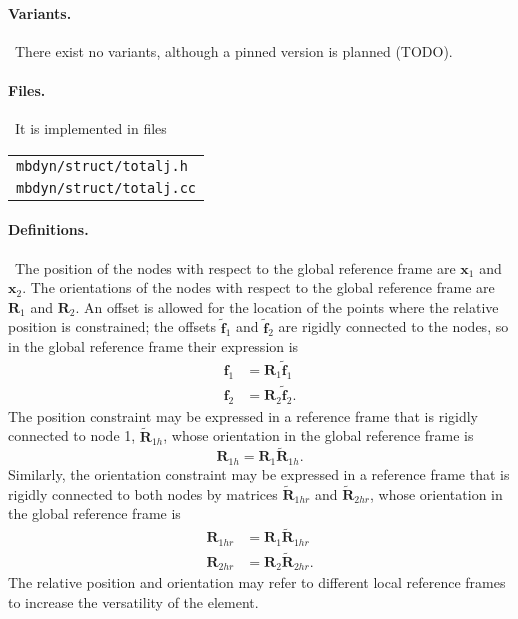 \documentclass[10pt,dvips,fleqn]{report}
\newcommand{\T}[1]{\boldsymbol{#1}}
\begin{document}
\paragraph{Variants.} \
There exist no variants, although a pinned version is planned (TODO).

\paragraph{Files.} \
It is implemented in files\\
\begin{tabular}{l}
\texttt{mbdyn/struct/totalj.h} \\
\texttt{mbdyn/struct/totalj.cc}
\end{tabular}

\paragraph{Definitions.} \
The position of the nodes with respect to the global reference frame
are $\T{x}_1$ and $\T{x}_2$.
The orientations of the nodes with respect to the global reference frame
are $\T{R}_1$ and $\T{R}_2$.
An offset is allowed for the location of the points where 
the relative position is constrained; the offsets $\tilde{\T{f}}_1$
and $\tilde{\T{f}}_2$ are rigidly connected to the nodes,
so in the global reference frame their expression is
\begin{align}
	\T{f}_1 &= \T{R}_1 \tilde{\T{f}}_1 \\
	\T{f}_2 &= \T{R}_2 \tilde{\T{f}}_2 .
\end{align}
The position constraint may be expressed in a reference frame 
that is rigidly connected to node 1, $\tilde{\T{R}}_{1h}$, whose orientation
in the global reference frame is
\begin{equation}
	\T{R}_{1h} = \T{R}_1 \tilde{\T{R}}_{1h} .
\end{equation}
Similarly, the orientation constraint may be expressed in a reference
frame that is rigidly connected to both nodes by matrices
$\tilde{\T{R}}_{1hr}$ and $\tilde{\T{R}}_{2hr}$, whose orientation
in the global reference frame is
\begin{align}
	\T{R}_{1hr} &= \T{R}_1 \tilde{\T{R}}_{1hr} \\
	\T{R}_{2hr} &= \T{R}_2 \tilde{\T{R}}_{2hr} .
\end{align}
The relative position and orientation may refer to different
local reference frames to increase the versatility of the element.
\end{document}
